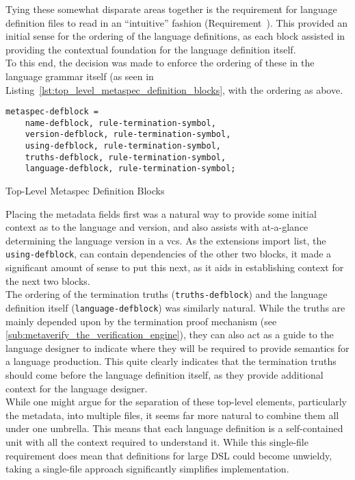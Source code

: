 Tying these somewhat disparate areas together is the requirement for language definition files to read in an ``intuitive'' fashion (Requirement~). 
This provided an initial sense for the ordering of the language definitions, as each block assisted in providing the contextual foundation for the language definition itself. \\

To this end, the decision was made to enforce the ordering of these in the language grammar itself (as seen in Listing~\ref{lst:top_level_metaspec_definition_blocks}, with the ordering as above.

\begin{listing}[!htb]
\begin{verbatim}
metaspec-defblock = 
    name-defblock, rule-termination-symbol, 
    version-defblock, rule-termination-symbol, 
    using-defblock, rule-termination-symbol, 
    truths-defblock, rule-termination-symbol, 
    language-defblock, rule-termination-symbol;
\end{verbatim}
\caption{Top-Level Metaspec Definition Blocks}
\label{lst:top_level_metaspec_definition_blocks}
\end{listing}

Placing the metadata fields first was a natural way to provide some initial context as to the language and version, and also assists with at-a-glance determining the language version in a \gls{vcs}.
As the extensions import list, the \texttt{using-defblock}, can contain dependencies of the other two blocks, it made a significant amount of sense to put this next, as it aids in establishing context for the next two blocks.\\

The ordering of the termination truths (\texttt{truths-defblock}) and the language definition itself (\texttt{language-defblock}) was similarly natural. 
While the truths are mainly depended upon by the termination proof mechanism (see \autoref{sub:metaverify_the_verification_engine}), they can also act as a guide to the language designer to indicate where they will be required to provide semantics for a language production. 
This quite clearly indicates that the termination truths should come before the language definition itself, as they provide additional context for the language designer.\\

While one might argue for the separation of these top-level elements, particularly the metadata, into multiple files, it seems far more natural to combine them all under one umbrella.
This means that each language definition is a self-contained unit with all the context required to understand it. 
While this single-file requirement does mean that definitions for large DSL could become unwieldy, taking a single-file approach significantly simplifies implementation.\\


